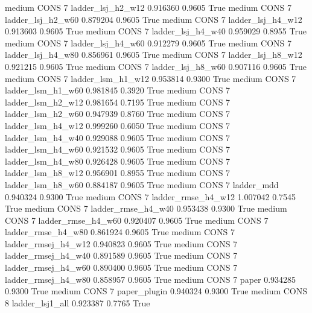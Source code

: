     medium     CONS                 7   ladder_lsj_h2_w12   0.916360      0.9605    True
    medium     CONS                 7   ladder_lsj_h2_w60   0.879204      0.9605    True
    medium     CONS                 7   ladder_lsj_h4_w12   0.913603      0.9605    True
    medium     CONS                 7   ladder_lsj_h4_w40   0.959029      0.8955    True
    medium     CONS                 7   ladder_lsj_h4_w60   0.912279      0.9605    True
    medium     CONS                 7   ladder_lsj_h4_w80   0.856961      0.9605    True
    medium     CONS                 7   ladder_lsj_h8_w12   0.921215      0.9605    True
    medium     CONS                 7   ladder_lsj_h8_w60   0.907116      0.9605    True
    medium     CONS                 7   ladder_lsm_h1_w12   0.953814      0.9300    True
    medium     CONS                 7   ladder_lsm_h1_w60   0.981845      0.3920    True
    medium     CONS                 7   ladder_lsm_h2_w12   0.981654      0.7195    True
    medium     CONS                 7   ladder_lsm_h2_w60   0.947939      0.8760    True
    medium     CONS                 7   ladder_lsm_h4_w12   0.999260      0.6050    True
    medium     CONS                 7   ladder_lsm_h4_w40   0.929088      0.9605    True
    medium     CONS                 7   ladder_lsm_h4_w60   0.921532      0.9605    True
    medium     CONS                 7   ladder_lsm_h4_w80   0.926428      0.9605    True
    medium     CONS                 7   ladder_lsm_h8_w12   0.956901      0.8955    True
    medium     CONS                 7   ladder_lsm_h8_w60   0.884187      0.9605    True
    medium     CONS                 7          ladder_mdd   0.940324      0.9300    True
    medium     CONS                 7  ladder_rmse_h4_w12   1.007042      0.7545    True
    medium     CONS                 7  ladder_rmse_h4_w40   0.953438      0.9300    True
    medium     CONS                 7  ladder_rmse_h4_w60   0.920407      0.9605    True
    medium     CONS                 7  ladder_rmse_h4_w80   0.861924      0.9605    True
    medium     CONS                 7 ladder_rmsej_h4_w12   0.940823      0.9605    True
    medium     CONS                 7 ladder_rmsej_h4_w40   0.891589      0.9605    True
    medium     CONS                 7 ladder_rmsej_h4_w60   0.890400      0.9605    True
    medium     CONS                 7 ladder_rmsej_h4_w80   0.858957      0.9605    True
    medium     CONS                 7               paper   0.934285      0.9300    True
    medium     CONS                 7        paper_plugin   0.940324      0.9300    True
    medium     CONS                 8     ladder_lsj1_all   0.923387      0.7765    True
